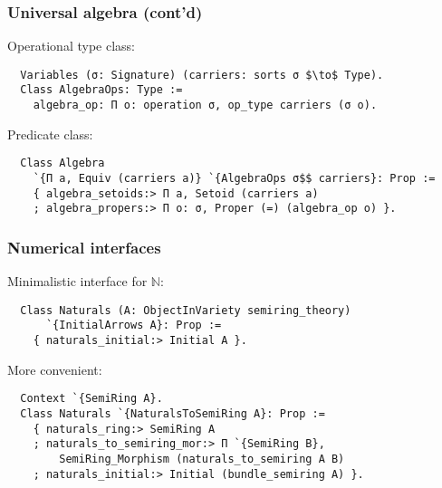 \documentclass{beamer}
\begin{document}
\begin{frame}[fragile]
\frametitle{Universal algebra (cont'd)}
Operational type class:
\begin{lstlisting}
  Variables (σ: Signature) (carriers: sorts σ $\to$ Type).
  Class AlgebraOps: Type :=
    algebra_op: Π o: operation σ, op_type carriers (σ o).
\end{lstlisting}
Predicate class:
\begin{lstlisting}
  Class Algebra
    `{Π a, Equiv (carriers a)} `{AlgebraOps σ$$ carriers}: Prop :=
    { algebra_setoids:> Π a, Setoid (carriers a)
    ; algebra_propers:> Π o: σ, Proper (=) (algebra_op o) }.
\end{lstlisting}
\end{frame}


\begin{frame}[fragile]
\frametitle{Numerical interfaces}

Minimalistic interface for $\mathbb{N}$:
\begin{lstlisting}
  Class Naturals (A: ObjectInVariety semiring_theory)
      `{InitialArrows A}: Prop :=
    { naturals_initial:> Initial A }.
\end{lstlisting}

More convenient: %
\begin{lstlisting}
  Context `{SemiRing A}. 
  Class Naturals `{NaturalsToSemiRing A}: Prop :=
    { naturals_ring:> SemiRing A
    ; naturals_to_semiring_mor:> Π `{SemiRing B},
        SemiRing_Morphism (naturals_to_semiring A B)
    ; naturals_initial:> Initial (bundle_semiring A) }.
\end{lstlisting}
\end{frame}
\end{document}
